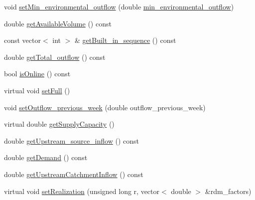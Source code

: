 \begin{DoxyCompactItemize}
\item 
void \mbox{\hyperlink{classWaterSource_a406246432d29f49189d53207ab1d895a_a406246432d29f49189d53207ab1d895a}{set\+Min\+\_\+environmental\+\_\+outflow}} (double \mbox{\hyperlink{classWaterSource_adae67ac96597e4b25332002b88a9a52b_adae67ac96597e4b25332002b88a9a52b}{min\+\_\+environmental\+\_\+outflow}})
\item 
double \mbox{\hyperlink{classWaterSource_a8eae3b16fc0f37780c1df827386f656e_a8eae3b16fc0f37780c1df827386f656e}{get\+Available\+Volume}} () const
\item 
const vector$<$ int $>$ \& \mbox{\hyperlink{classWaterSource_a09b60eb2e318c72a42cd6bdd336a6f67_a09b60eb2e318c72a42cd6bdd336a6f67}{get\+Built\+\_\+in\+\_\+sequence}} () const
\item 
double \mbox{\hyperlink{classWaterSource_a7678e05e3e73b927c0b47e3041d7415f_a7678e05e3e73b927c0b47e3041d7415f}{get\+Total\+\_\+outflow}} () const
\item 
bool \mbox{\hyperlink{classWaterSource_a130fd661ff31c53115cca23e4e2f210a_a130fd661ff31c53115cca23e4e2f210a}{is\+Online}} () const
\item 
virtual void \mbox{\hyperlink{classWaterSource_a5f8007eb1ae604cfaa67ebb4c0c46eb1_a5f8007eb1ae604cfaa67ebb4c0c46eb1}{set\+Full}} ()
\item 
void \mbox{\hyperlink{classWaterSource_ab53d376a425b8db603382ba27b52b1d4_ab53d376a425b8db603382ba27b52b1d4}{set\+Outflow\+\_\+previous\+\_\+week}} (double outflow\+\_\+previous\+\_\+week)
\item 
virtual double \mbox{\hyperlink{classWaterSource_aa4cbbd1ee0fc5ea9291eb5d8067b3aa0_aa4cbbd1ee0fc5ea9291eb5d8067b3aa0}{get\+Supply\+Capacity}} ()
\item 
double \mbox{\hyperlink{classWaterSource_ad7e60efd7395f8d3e674e602226e5ac1_ad7e60efd7395f8d3e674e602226e5ac1}{get\+Upstream\+\_\+source\+\_\+inflow}} () const
\item 
double \mbox{\hyperlink{classWaterSource_ac57d6b292490333b5bc14233bce326ce_ac57d6b292490333b5bc14233bce326ce}{get\+Demand}} () const
\item 
double \mbox{\hyperlink{classWaterSource_afd2a153ba8f4ecaa9f8fa851d5a1727c_afd2a153ba8f4ecaa9f8fa851d5a1727c}{get\+Upstream\+Catchment\+Inflow}} () const
\item 
virtual void \mbox{\hyperlink{classWaterSource_af72660e62fda45b6ae53da5f0afd86db_af72660e62fda45b6ae53da5f0afd86db}{set\+Realization}} (unsigned long r, vector$<$ double $>$ \&rdm\+\_\+factors)
\item 

\end{DoxyCompactItemize}
